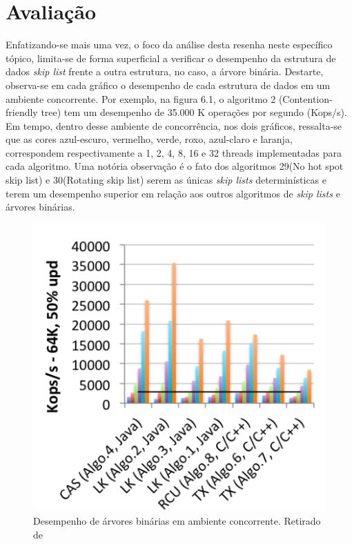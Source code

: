 \documentclass[paper=a4, fontsize=11pt]{scrartcl} %
\numberwithin{equation}{section}
\numberwithin{figure}{section}
\numberwithin{table}{section}
\numberwithin{definition}{section}
\numberwithin{theorem}{section}
\numberwithin{property}{section}
\numberwithin{proposition}{section}
\begin{document}
\pagebreak
            
 \section{Avalia\c{c}\~{a}o}  
 
Enfatizando-se mais uma vez, o foco da an\'{a}lise desta resenha neste espec\'{i}fico t\'{o}pico,  limita-se de forma superficial a verificar o desempenho da estrutura de dados \textit{skip list } frente a outra estrutura, no caso, a \'{a}rvore bin\'{a}ria. Destarte, observa-se em cada gr\'{a}fico o desempenho de cada estrutura de dados em um ambiente concorrente. Por exemplo, na figura 6.1, o algoritmo 2 (Contention-friendly tree) tem um desempenho de 35.000 K opera\c{c}\~{o}es por segundo (Kops/s). Em tempo, dentro desse ambiente de concorr\^{e}ncia, nos dois gr\'{a}ficos, ressalta-se que as cores azul-escuro, vermelho, verde, roxo, azul-claro e laranja, correspondem respectivamente a 1, 2, 4, 8, 16 e 32 threads implementadas para cada algoritmo.  Uma not\'{o}ria observa\c{c}\~{a}o  \'{e} o fato dos algoritmos 29(No hot spot skip list) e 30(Rotating skip list) serem as \'{u}nicas \textit{skip lists} determin\'{i}sticas e terem um desempenho superior em rela\c{c}\~{a}o aos outros algoritmos de \textit{skip lists} e \'{a}rvores bin\'{a}rias. 
 

\begin{figure}[htpb]
  \includegraphics[scale = 0.48]{BT.png}
  \caption{Desempenho de \'{a}rvores bin\'{a}rias em ambiente concorrente. Retirado de \cite{Gramoli2015more}}
\end{figure}
\end{document}
